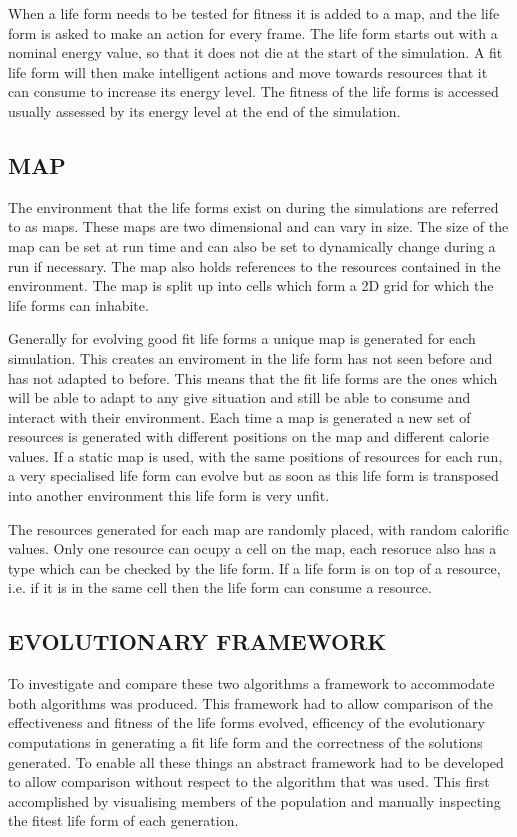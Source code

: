 \documentclass[10pt,twocolumn]{article}
\begin{document}
When a life form needs to be tested for fitness it is added to a map, and the life form is asked to make an action for every frame. The life form starts out
with a nominal energy value, so that it does not die at the start of the simulation. A fit life form will then make intelligent actions and move towards resources
that it can consume to increase its energy level. The fitness of the life forms is accessed usually assessed by its energy level at the end of the simulation. 


\subsection{MAP}

The environment that the life forms exist on during the simulations are referred to as maps. These maps are two dimensional and can vary in size.
The size of the map can be set at run time and can also be set to dynamically change during a run if necessary. The map also holds references
to the resources contained in the environment. The map is split up into cells which form a 2D grid for which the life forms can inhabite. 

Generally for evolving good fit life forms a unique map is generated for each simulation. This creates an enviroment in the life form has not
seen before and has not adapted to before. This means that the fit life forms are the ones which will be able to adapt to any give situation
and still be able to consume and interact with their environment. Each time a map is generated a new set of resources is generated with different
positions on the map and different calorie values. If a static map is used, with the same positions of resources for each run, a very specialised 
life form can evolve but as soon as this life form is transposed into another environment this life form is very unfit.

The resources generated for each map are randomly placed, with random calorific values. Only one resource can ocupy a cell on the map, each resoruce also has
a type which can be checked by the life form. If a life form is on top of a resource, i.e. if it is in the same cell then the life form can consume a resource. 
 

\subsection{EVOLUTIONARY FRAMEWORK}
To investigate and compare these two algorithms %
a framework to accommodate both algorithms was produced. This framework had to allow comparison of the effectiveness and fitness of the life forms evolved, efficency of the 
evolutionary computations in generating a fit life form and the correctness of the solutions generated. To enable all these things an abstract framework had 
to be developed to allow comparison without respect to the algorithm that was used. This first accomplished by visualising members of the population and 
manually inspecting the fitest life form of each generation. 
\end{document}
